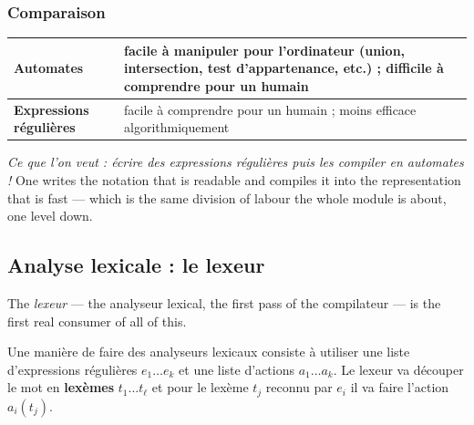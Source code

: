 \subsubsection{Comparaison}
\begin{center}
  \begin{tabularx}{\textwidth}{@{}lX@{}}
    \toprule
    \textbf{Automates} & facile à manipuler pour l'ordinateur (union,
      intersection, test d'appartenance, etc.) ; difficile à comprendre pour un
      humain \\
    \midrule
    \textbf{Expressions régulières} & facile à comprendre pour un humain ; moins
      efficace algorithmiquement \\
    \bottomrule
  \end{tabularx}
\end{center}

\begin{conclusion}
  \emph{Ce que l'on veut : écrire des expressions régulières puis les compiler
  en automates !} One writes the notation that is readable and compiles it into
  the representation that is fast --- which is the same division of labour the
  whole module is about, one level down.
\end{conclusion}

\subsection{Analyse lexicale : le lexeur}
The \textit{lexeur} --- the analyseur lexical, the first pass of the
compilateur --- is the first real consumer of all of this.

\begin{definition}
  Une manière de faire des analyseurs lexicaux consiste à utiliser une liste
  d'expressions régulières $e_1 \ldots e_k$ et une liste d'actions
  $a_1 \ldots a_k$. Le lexeur va découper le mot en \textbf{lexèmes}
  $t_1 \ldots t_\ell$ et pour le lexème $t_j$ reconnu par $e_i$ il va faire
  l'action $a_i(t_j)$.
\end{definition}

\begin{figure}[h!]
  \centering
\end{figure}

